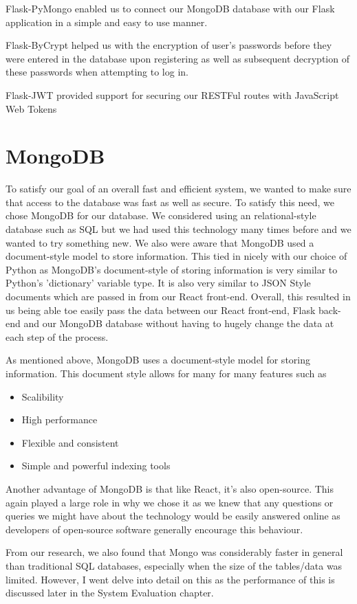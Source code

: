 Flask-PyMongo enabled us to connect our MongoDB database with our Flask application in a simple and easy to use manner. 

Flask-ByCrypt helped us with the encryption of user's passwords before they were entered in the database upon registering as well as subsequent decryption of these passwords when attempting to log in.

Flask-JWT provided support for securing our RESTFul routes with JavaScript Web Tokens 

\section{MongoDB}
To satisfy our goal of an overall fast and efficient system, we wanted to make sure that access to the database was fast as well as secure. To satisfy this need, we chose MongoDB for our database.
We considered using an relational-style database such as SQL but we had used this technology many times before and we wanted to try something new. We also were aware that MongoDB used a document-style model to store information. This tied in nicely with our choice of Python as MongoDB's document-style of storing information is very similar to Python's 'dictionary' variable type.
It is also very similar to JSON Style documents which are passed in from our React front-end. Overall, this resulted in us being able toe easily pass the data between our React front-end, Flask back-end and our MongoDB database without having to hugely change the data at each step of the process.

As mentioned above, MongoDB uses a document-style model for storing information. This document style allows for many for many features such as 

\begin{itemize}
  \item Scalibility
  \item High performance
  \item Flexible and consistent
  \item Simple and powerful indexing tools
\end{itemize}

Another advantage of MongoDB is that like React, it's also open-source. This again played a large role in why we chose it as we knew that any questions or queries we might have about the technology would be easily answered online as developers of open-source software generally encourage this behaviour.

From our research, we also found that Mongo was considerably faster in general than traditional SQL databases, especially when the size of the tables/data was limited. However, I went delve into detail on this as the performance of this is discussed later in the System Evaluation chapter.

